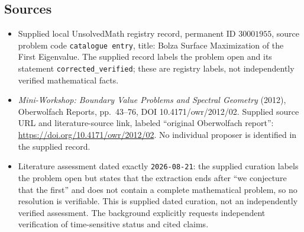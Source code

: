 \documentclass[11pt]{article}
\begin{document}
\subsection{Sources}
\begin{itemize}
\item Supplied local UnsolvedMath registry record, permanent ID $30001955$, source problem code \texttt{catalogue entry}, title: Bolza Surface Maximization of the First Eigenvalue. The supplied record labels the problem open and its statement \texttt{corrected\_verified}; these are registry labels, not independently verified mathematical facts.
\item \emph{Mini-Workshop: Boundary Value Problems and Spectral Geometry} (2012), Oberwolfach Reports, pp.~43--76, DOI 10.4171/owr/2012/02. Supplied source URL and literature-source link, labeled ``original Oberwolfach report'': \url{https://doi.org/10.4171/owr/2012/02}. No individual proposer is identified in the supplied record.
\item Literature assessment dated exactly \texttt{2026-08-21}: the supplied curation labels the problem open but states that the extraction ends after ``we conjecture that the first'' and does not contain a complete mathematical problem, so no resolution is verifiable. This is supplied dated curation, not an independently verified assessment. The background explicitly requests independent verification of time-sensitive status and cited claims.
\end{itemize}
\end{document}
